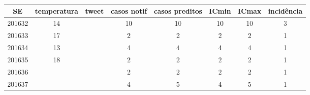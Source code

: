 \begin{tabular}{c|ccccccc}
  \hline
SE & temperatura & tweet & casos notif & casos preditos & ICmin & ICmax & incidência \\ 
  \hline
201632 & 14 &  & 10 & 10 & 10 & 10 & 3 \\ 
  201633 & 17 &  & 2 & 2 & 2 & 2 & 1 \\ 
  201634 & 13 &  & 4 & 4 & 4 & 4 & 1 \\ 
  201635 & 18 &  & 2 & 2 & 2 & 2 & 1 \\ 
  201636 &  &  & 2 & 2 & 2 & 2 & 1 \\ 
  201637 &  &  & 4 & 5 & 4 & 5 & 1 \\ 
   \hline
\end{tabular}
